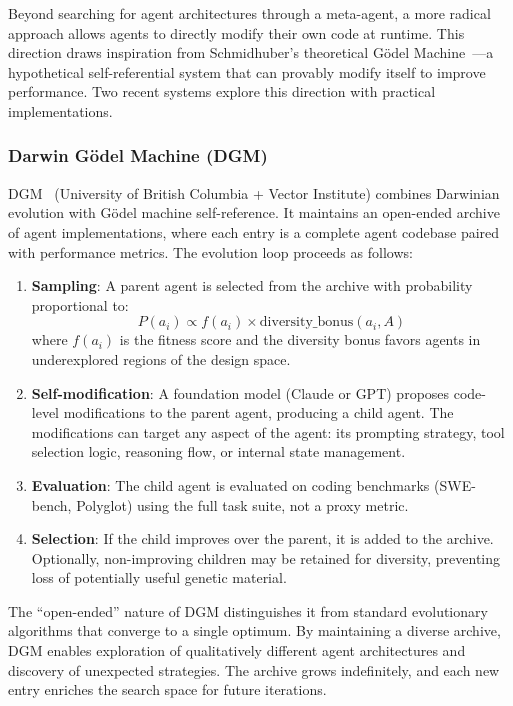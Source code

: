 Beyond searching for agent architectures through a meta-agent, a more radical approach allows agents to directly modify their own code at runtime. This direction draws inspiration from Schmidhuber's theoretical G\"odel Machine~\citep{schmidhuber2003godel}---a hypothetical self-referential system that can provably modify itself to improve performance. Two recent systems explore this direction with practical implementations.

\subsubsection{Darwin G\"odel Machine (DGM)}
\label{sec:dgm}

DGM~\citep{zhang2025dgm} (University of British Columbia + Vector Institute) combines Darwinian evolution with G\"odel machine self-reference. It maintains an open-ended archive of agent implementations, where each entry is a complete agent codebase paired with performance metrics. The evolution loop proceeds as follows:

\begin{enumerate}
\item \textbf{Sampling}: A parent agent is selected from the archive with probability proportional to:
\begin{equation}
P(a_i) \propto f(a_i) \times \text{diversity\_bonus}(a_i, A)
\end{equation}
where $f(a_i)$ is the fitness score and the diversity bonus favors agents in underexplored regions of the design space.

\item \textbf{Self-modification}: A foundation model (Claude or GPT) proposes code-level modifications to the parent agent, producing a child agent. The modifications can target any aspect of the agent: its prompting strategy, tool selection logic, reasoning flow, or internal state management.

\item \textbf{Evaluation}: The child agent is evaluated on coding benchmarks (SWE-bench, Polyglot) using the full task suite, not a proxy metric.

\item \textbf{Selection}: If the child improves over the parent, it is added to the archive. Optionally, non-improving children may be retained for diversity, preventing loss of potentially useful genetic material.
\end{enumerate}

The ``open-ended'' nature of DGM distinguishes it from standard evolutionary algorithms that converge to a single optimum. By maintaining a diverse archive, DGM enables exploration of qualitatively different agent architectures and discovery of unexpected strategies. The archive grows indefinitely, and each new entry enriches the search space for future iterations.

